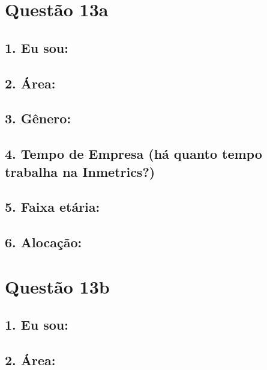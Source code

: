 \documentclass[]{book}
\begin{document}
\hypertarget{questao-13a}{%
\section{Questão 13a}\label{questao-13a}}

\hypertarget{eu-sou-17}{%
\subsection{1. Eu sou:}\label{eu-sou-17}}

\hypertarget{area-17}{%
\subsection{2. Área:}\label{area-17}}

\hypertarget{genero-17}{%
\subsection{3. Gênero:}\label{genero-17}}

\hypertarget{tempo-de-empresa-ha-quanto-tempo-trabalha-na-inmetrics-17}{%
\subsection{4. Tempo de Empresa (há quanto tempo trabalha na Inmetrics?)}\label{tempo-de-empresa-ha-quanto-tempo-trabalha-na-inmetrics-17}}

\hypertarget{faixa-etaria-17}{%
\subsection{5. Faixa etária:}\label{faixa-etaria-17}}

\hypertarget{alocacao-17}{%
\subsection{6. Alocação:}\label{alocacao-17}}

\hypertarget{questao-13b}{%
\section{Questão 13b}\label{questao-13b}}

\hypertarget{eu-sou-18}{%
\subsection{1. Eu sou:}\label{eu-sou-18}}

\hypertarget{area-18}{%
\subsection{2. Área:}\label{area-18}}
\end{document}
